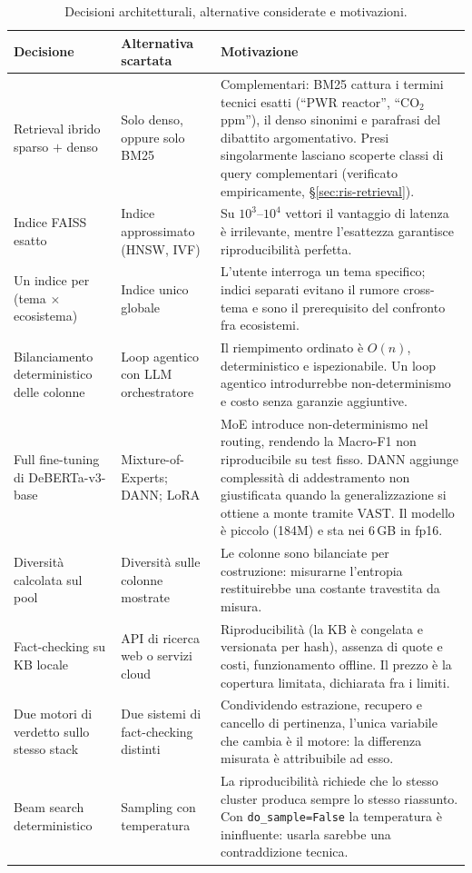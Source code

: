 \documentclass[11pt,a4paper]{report}
\begin{document}
\begin{table}[p]
\centering
\small
\begin{tabularx}{\textwidth}{p{2.9cm}p{3.0cm}X}
\toprule
\textbf{Decisione} & \textbf{Alternativa scartata} & \textbf{Motivazione} \\
\midrule
Retrieval ibrido sparso $+$ denso &
Solo denso, oppure solo BM25 &
Complementari: BM25 cattura i termini tecnici esatti (``PWR reactor'', ``CO$_2$ ppm''), il denso
sinonimi e parafrasi del dibattito argomentativo. Presi singolarmente lasciano scoperte classi
di query complementari (verificato empiricamente, \S\ref{sec:ris-retrieval}). \\
\addlinespace
Indice FAISS esatto &
Indice approssimato (HNSW, IVF) &
Su $10^3$--$10^4$ vettori il vantaggio di latenza è irrilevante, mentre l'esattezza garantisce
riproducibilità perfetta. \\
\addlinespace
Un indice per (tema $\times$ ecosistema) &
Indice unico globale &
L'utente interroga un tema specifico; indici separati evitano il rumore cross-tema e sono il
prerequisito del confronto fra ecosistemi. \\
\addlinespace
Bilanciamento deterministico delle colonne &
Loop agentico con LLM orchestratore &
Il riempimento ordinato è $O(n)$, deterministico e ispezionabile. Un loop agentico
introdurrebbe non-determinismo e costo senza garanzie aggiuntive. \\
\addlinespace
Full fine-tuning di DeBERTa-v3-base &
Mixture-of-Experts; DANN; LoRA &
MoE introduce non-determinismo nel routing, rendendo la Macro-F1 non riproducibile su test
fisso. DANN aggiunge complessità di addestramento non giustificata quando la generalizzazione si
ottiene a monte tramite VAST. Il modello è piccolo (184M) e sta nei 6\,GB in fp16. \\
\addlinespace
Diversità calcolata sul pool &
Diversità sulle colonne mostrate &
Le colonne sono bilanciate per costruzione: misurarne l'entropia restituirebbe una costante
travestita da misura. \\
\addlinespace
Fact-checking su KB locale &
API di ricerca web o servizi cloud &
Riproducibilità (la KB è congelata e versionata per hash), assenza di quote e costi,
funzionamento offline. Il prezzo è la copertura limitata, dichiarata fra i limiti. \\
\addlinespace
Due motori di verdetto sullo stesso stack &
Due sistemi di fact-checking distinti &
Condividendo estrazione, recupero e cancello di pertinenza, l'unica variabile che cambia è il
motore: la differenza misurata è attribuibile ad esso. \\
\addlinespace
Beam search deterministico &
Sampling con temperatura &
La riproducibilità richiede che lo stesso cluster produca sempre lo stesso riassunto. Con
\texttt{do\_sample=False} la temperatura è ininfluente: usarla sarebbe una contraddizione
tecnica. \\
\bottomrule
\end{tabularx}
\caption{Decisioni architetturali, alternative considerate e motivazioni.}
\label{tab:decisioni}
\end{table}
\end{document}
